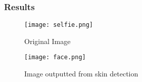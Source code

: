 \documentclass[12pt, letterpaper]{article}
\begin{document}
\subsubsection{Results}

\begin{figure}[H]
    \centering
    \texttt{[image: selfie.png]}
    \caption{Original Image}
\end{figure}

\begin{figure}[H]
    \centering
    \texttt{[image: face.png]}
    \caption{Image outputted from skin detection}
\end{figure}
\end{document}
